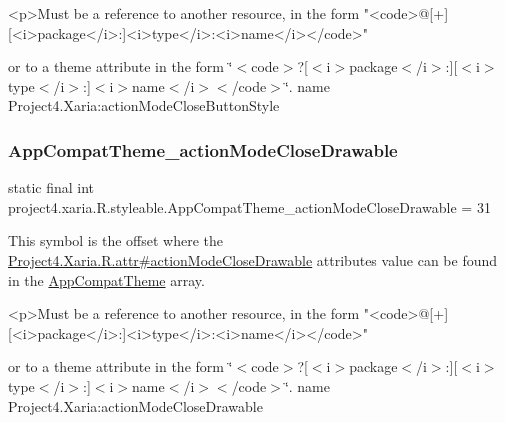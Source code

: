 \begin{DoxyVerb}      <p>Must be a reference to another resource, in the form "<code>@[+][<i>package</i>:]<i>type</i>:<i>name</i></code>"
\end{DoxyVerb}
 or to a theme attribute in the form \char`\"{}$<$code$>$?\mbox{[}$<$i$>$package$<$/i$>$\+:\mbox{]}\mbox{[}$<$i$>$type$<$/i$>$\+:\mbox{]}$<$i$>$name$<$/i$>$$<$/code$>$\char`\"{}.  name Project4.\+Xaria\+:action\+Mode\+Close\+Button\+Style \mbox{\label{classproject4_1_1xaria_1_1R_1_1styleable_a2985c0df6c42837198bb3acd6f1017e8}} 
\subsubsection{\texorpdfstring{App\+Compat\+Theme\+\_\+action\+Mode\+Close\+Drawable}{AppCompatTheme\_actionModeCloseDrawable}}
{\footnotesize\ttfamily static final int project4.\+xaria.\+R.\+styleable.\+App\+Compat\+Theme\+\_\+action\+Mode\+Close\+Drawable = 31\hspace{0.3cm}{\ttfamily [static]}}

This symbol is the offset where the \hyperlink{}{Project4.\+Xaria.\+R.\+attr\#action\+Mode\+Close\+Drawable} attribute\textquotesingle{}s value can be found in the \hyperlink{classproject4_1_1xaria_1_1R_1_1styleable_aad8bec413e2350f9404e6ff0e831a85d}{App\+Compat\+Theme} array.

\begin{DoxyVerb}      <p>Must be a reference to another resource, in the form "<code>@[+][<i>package</i>:]<i>type</i>:<i>name</i></code>"
\end{DoxyVerb}
 or to a theme attribute in the form \char`\"{}$<$code$>$?\mbox{[}$<$i$>$package$<$/i$>$\+:\mbox{]}\mbox{[}$<$i$>$type$<$/i$>$\+:\mbox{]}$<$i$>$name$<$/i$>$$<$/code$>$\char`\"{}.  name Project4.\+Xaria\+:action\+Mode\+Close\+Drawable \mbox{\label{classproject4_1_1xaria_1_1R_1_1styleable_a22f8d7130857992c2c71953f7ab16efb}} 
